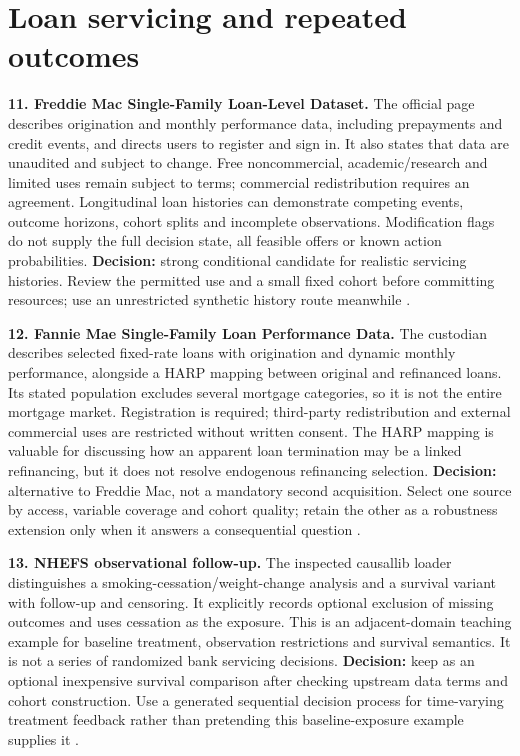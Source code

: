 \hypertarget{loan-servicing-and-repeated-outcomes}{%
\section{Loan servicing and repeated
outcomes}\label{loan-servicing-and-repeated-outcomes}}

\textbf{11. Freddie Mac Single-Family Loan-Level Dataset.} The official
page describes origination and monthly performance data, including
prepayments and credit events, and directs users to register and sign
in. It also states that data are unaudited and subject to change. Free
noncommercial, academic/research and limited uses remain subject to
terms; commercial redistribution requires an agreement. Longitudinal
loan histories can demonstrate competing events, outcome horizons,
cohort splits and incomplete observations. Modification flags do not
supply the full decision state, all feasible offers or known action
probabilities. \textbf{Decision:} strong conditional candidate for
realistic servicing histories. Review the permitted use and a small
fixed cohort before committing resources; use an unrestricted synthetic
history route meanwhile \citep{pd15_freddie}.

\textbf{12. Fannie Mae Single-Family Loan Performance Data.} The
custodian describes selected fixed-rate loans with origination and
dynamic monthly performance, alongside a HARP mapping between original
and refinanced loans. Its stated population excludes several mortgage
categories, so it is not the entire mortgage market. Registration is
required; third-party redistribution and external commercial uses are
restricted without written consent. The HARP mapping is valuable for
discussing how an apparent loan termination may be a linked refinancing,
but it does not resolve endogenous refinancing selection.
\textbf{Decision:} alternative to Freddie Mac, not a mandatory second
acquisition. Select one source by access, variable coverage and cohort
quality; retain the other as a robustness extension only when it answers
a consequential question \citep{pd15_fannie}.

\textbf{13. NHEFS observational follow-up.} The inspected causallib
loader distinguishes a smoking-cessation/weight-change analysis and a
survival variant with follow-up and censoring. It explicitly records
optional exclusion of missing outcomes and uses cessation as the
exposure. This is an adjacent-domain teaching example for baseline
treatment, observation restrictions and survival semantics. It is not a
series of randomized bank servicing decisions. \textbf{Decision:} keep
as an optional inexpensive survival comparison after checking upstream
data terms and cohort construction. Use a generated sequential decision
process for time-varying treatment feedback rather than pretending this
baseline-exposure example supplies it \citep{pd15_nhefs_pinned}.

